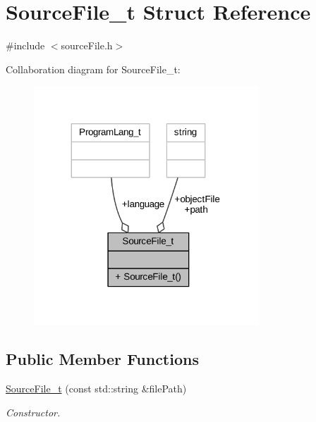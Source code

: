 \hypertarget{struct_source_file__t}{}\section{Source\+File\+\_\+t Struct Reference}
\label{struct_source_file__t}


{\ttfamily \#include $<$source\+File.\+h$>$}



Collaboration diagram for Source\+File\+\_\+t\+:
\nopagebreak
\begin{figure}[H]
\begin{center}
\leavevmode
\includegraphics[width=239pt]{struct_source_file__t__coll__graph}
\end{center}
\end{figure}
\subsection*{Public Member Functions}
\begin{DoxyCompactItemize}
\item 
\hyperlink{struct_source_file__t_ae73665fef4cc65696bd64f811e7edb74}{Source\+File\+\_\+t} (const std\+::string \&file\+Path)
\begin{DoxyCompactList}\small\item\em Constructor. \end{DoxyCompactList}\end{DoxyCompactItemize}
